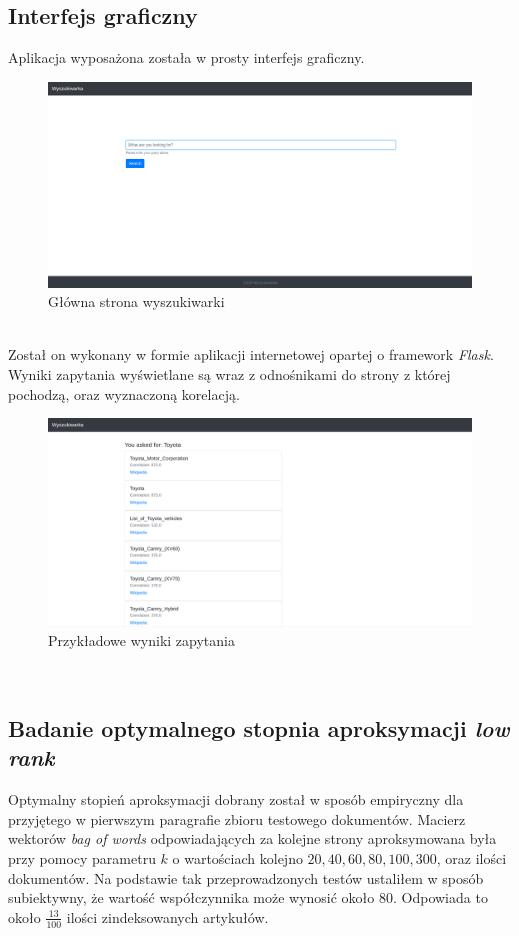 \documentclass{article}
\begin{document}
        \subsection{Interfejs graficzny}
        Aplikacja wyposażona została w prosty interfejs graficzny.
        \begin{figure}[h!]
            \centering
            \includegraphics[width=14cm]{lab6/img/front_index.png}
            \caption{Główna strona wyszukiwarki}
        \end{figure}\\
        Został on wykonany w formie aplikacji internetowej opartej o framework \textit{Flask}. \\
        Wyniki zapytania wyświetlane są wraz z odnośnikami do strony z której pochodzą, oraz wyznaczoną korelacją. 
        \begin{figure}[h!]
            \centering
            \includegraphics[width=14cm]{lab6/img/front_result1.png}
            \caption{Przykładowe wyniki zapytania}
        \end{figure}\\
        \FloatBarrier

        \subsection{Badanie optymalnego stopnia aproksymacji \textit{low rank}}
        Optymalny stopień aproksymacji dobrany został w sposób empiryczny dla przyjętego w pierwszym paragrafie zbioru testowego dokumentów. Macierz wektorów \textit{bag of words} odpowiadających za kolejne strony aproksymowana była przy pomocy parametru $k$ o wartościach kolejno ${20,40,60,80,100,300}$, oraz ilości dokumentów. Na podstawie tak przeprowadzonych testów ustaliłem w sposób subiektywny, że wartość współczynnika może wynosić około $80$. Odpowiada to około $\frac{13}{100}$ ilości zindeksowanych artykułów. 
\end{document}
